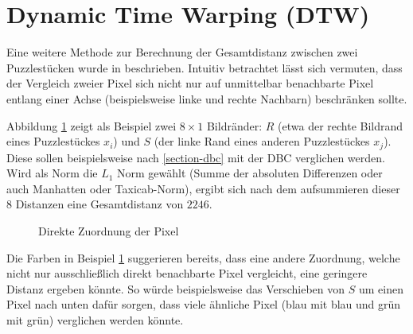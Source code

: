 \documentclass{whswinvcbook}
\begin{document}
\section{Dynamic Time Warping (DTW)}
Eine weitere Methode zur Berechnung der Gesamtdistanz zwischen zwei Puzzlestücken wurde in \cite{hungarian} beschrieben. Intuitiv betrachtet lässt sich vermuten, dass der Vergleich zweier Pixel sich nicht nur auf unmittelbar benachbarte Pixel entlang einer Achse (beispielsweise linke und rechte Nachbarn) beschränken sollte.

Abbildung \ref{fig-dtw-ex} zeigt als Beispiel zwei $8\times1$ Bildränder: $R$ (etwa der rechte Bildrand eines Puzzlestückes $x_i$) und $S$ (der linke Rand eines anderen Puzzlestückes $x_j$). Diese sollen beispielsweise nach \ref{section-dbc} mit der DBC verglichen werden. Wird als Norm die $L_1$ Norm gewählt (Summe der absoluten Differenzen oder auch Manhatten oder Taxicab-Norm), ergibt sich nach dem aufsummieren dieser $8$ Distanzen eine Gesamtdistanz von $2246$.
\begin{figure}[H]
    \centering
    \quad\quad\quad\quad
    \caption{Direkte Zuordnung der Pixel}
    \label{fig-dtw-ex}
\end{figure}
Die Farben in Beispiel \ref{fig-dtw-ex} suggerieren bereits, dass eine andere Zuordnung, welche nicht nur ausschließlich direkt benachbarte Pixel vergleicht, eine geringere Distanz ergeben könnte. So würde beispielsweise das Verschieben von $S$ um einen Pixel nach unten dafür sorgen, dass viele ähnliche Pixel (blau mit blau und grün mit grün) verglichen werden könnte.
\end{document}
